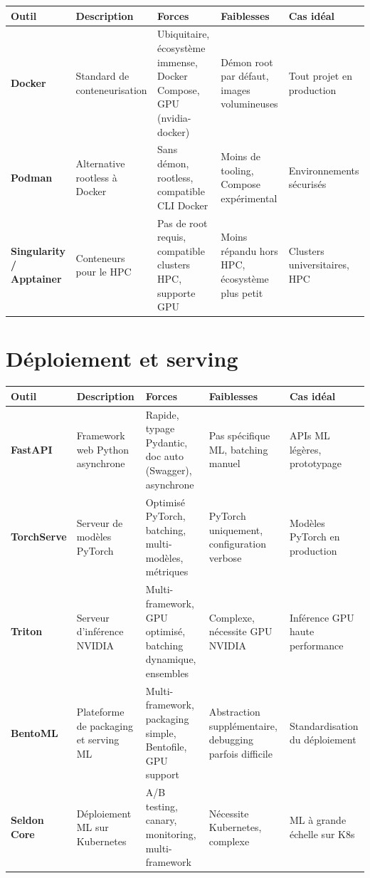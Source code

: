 \begin{center}
\small
\begin{tabular}{@{}p{2cm}p{3cm}p{3cm}p{3cm}p{2cm}@{}}
\toprule
\textbf{Outil} & \textbf{Description} & \textbf{Forces} &
  \textbf{Faiblesses} & \textbf{Cas id\'eal} \\
\midrule
\textbf{Docker} & Standard de conteneurisation &
  Ubiquitaire, \'ecosyst\`eme immense, Docker Compose, GPU (nvidia-docker) &
  D\'emon root par d\'efaut, images volumineuses &
  Tout projet en production \\
\addlinespace
\textbf{Podman} & Alternative rootless \`a Docker &
  Sans d\'emon, rootless, compatible CLI Docker &
  Moins de tooling, Compose exp\'erimental &
  Environnements s\'ecuris\'es \\
\addlinespace
\textbf{Singularity / Apptainer} & Conteneurs pour le HPC &
  Pas de root requis, compatible clusters HPC, supporte GPU &
  Moins r\'epandu hors HPC, \'ecosyst\`eme plus petit &
  Clusters universitaires, HPC \\
\bottomrule
\end{tabular}
\end{center}

\section{D\'eploiement et serving}
\label{app:deployment}

\begin{center}
\small
\begin{tabular}{@{}p{2cm}p{2.8cm}p{3cm}p{3cm}p{2cm}@{}}
\toprule
\textbf{Outil} & \textbf{Description} & \textbf{Forces} &
  \textbf{Faiblesses} & \textbf{Cas id\'eal} \\
\midrule
\textbf{FastAPI} & Framework web Python asynchrone &
  Rapide, typage Pydantic, doc auto (Swagger), asynchrone &
  Pas sp\'ecifique ML, batching manuel &
  APIs ML l\'eg\`eres, prototypage \\
\addlinespace
\textbf{TorchServe} & Serveur de mod\`eles PyTorch &
  Optimis\'e PyTorch, batching, multi-mod\`eles, m\'etriques &
  PyTorch uniquement, configuration verbose &
  Mod\`eles PyTorch en production \\
\addlinespace
\textbf{Triton} & Serveur d'inf\'erence NVIDIA &
  Multi-framework, GPU optimis\'e, batching dynamique, ensembles &
  Complexe, n\'ecessite GPU NVIDIA &
  Inf\'erence GPU haute performance \\
\addlinespace
\textbf{BentoML} & Plateforme de packaging et serving ML &
  Multi-framework, packaging simple, Bentofile, GPU support &
  Abstraction suppl\'ementaire, debugging parfois difficile &
  Standardisation du d\'eploiement \\
\addlinespace
\textbf{Seldon Core} & D\'eploiement ML sur Kubernetes &
  A/B testing, canary, monitoring, multi-framework &
  N\'ecessite Kubernetes, complexe &
  ML \`a grande \'echelle sur K8s \\
\bottomrule
\end{tabular}
\end{center}

